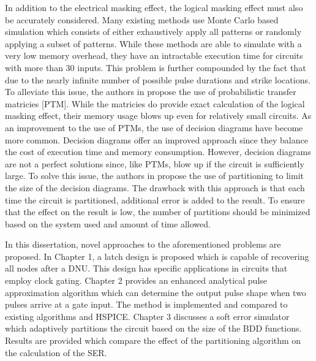 In addition to the electrical masking effect, the logical masking effect must also be accurately considered. Many existing methods use Monte Carlo based simulation which consists of either exhaustively apply all patterns or randomly applying a subset of patterns. \cite{Accurate_Masking,PARAM_DESC,SEMM,SERA,SETA_LA} While these methods are able to simulate with a very low memory overhead, they have an intractable execution time for circuits with more than 30 inputs. This problem is further compounded by the fact that due to the nearly infinite number of possible pulse durations and strike locations. To alleviate this issue, the authors in \cite{PTM} propose the use of probabilistic transfer matricies [PTM]. While the matricies do provide exact calculation of the logical masking effect, their memory usage blows up even for relatively small circuits. As an improvement to the use of PTMs, the use of decision diagrams have become more common. \cite{FASER,MARS_C} Decision diagrams offer an improved approach since they balance the cost of execution time and memory consumption. However, decision diagrams are not a perfect solutions since, like PTMs, blow up if the circuit is sufficiently large. To solve this issue, the authors in \cite{FASER} propose the use of partitioning to limit the size of the decision diagrams. The drawback with this approach is that each time the circuit is partitioned, additional error is added to the result. To ensure that the effect on the result is low, the number of partitions should be minimized based on the system used and amount of time allowed. 

In this dissertation, novel approaches to the aforementioned problems are proposed. In Chapter 1, a latch design is proposed which is capable of recovering all nodes after a DNU. This design has specific applications in circuits that employ clock gating. Chapter 2 provides an enhanced analytical pulse approximation algorithm which can determine the output pulse shape when two pulses arrive at a gate input. The method is implemented and compared to existing algorithms and HSPICE. Chapter 3 discusses a soft error simulator which adaptively partitions the circuit based on the size of the BDD functions. Results are provided which compare the effect of the partitioning algorithm on the calculation of the SER.